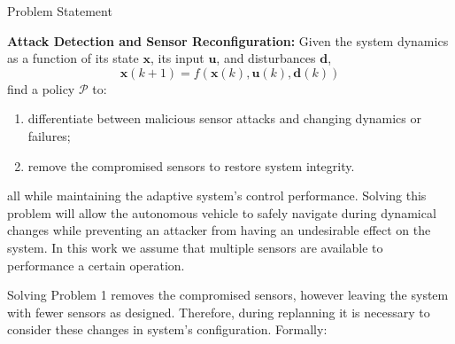 \begin{section}{Problem Statement}
\begin{problem} 
\label{problem1} {\textbf{Attack Detection and Sensor Reconfiguration:}} 
 Given the system dynamics as a function of its state $ \bm{x} $, its input $ \bm{u}$, and disturbances $ \bm{d} $,
	\begin{equation}
		\bm{x}(k+1) = f(\bm{x}(k), \bm{u}(k), \bm{d}(k))
	\end{equation}
find a policy $\mathcal{P}$ to:
\begin{enumerate}
	\item differentiate between malicious sensor attacks and changing dynamics or failures; 
	\item remove the compromised sensors to restore system integrity.  %
\end{enumerate}
all while maintaining the adaptive system's control performance. Solving this problem will allow the autonomous vehicle to safely navigate during dynamical changes while preventing an attacker from having an undesirable effect on the system. In this work we assume that multiple sensors are available to performance a certain operation. 
\end{problem}
Solving Problem 1 removes the compromised sensors, however leaving the system with fewer sensors as designed. Therefore, during replanning it is necessary to consider these changes in system's configuration. Formally:
	

\end{section}
